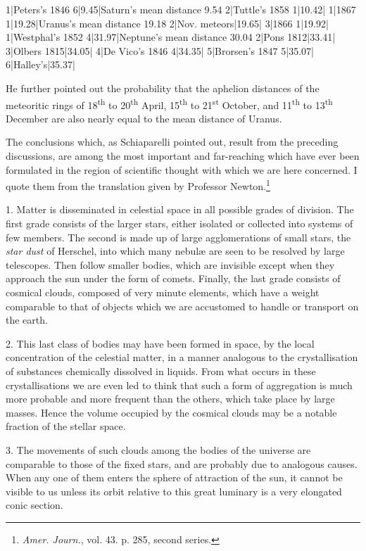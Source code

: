 \documentclass[a4paper, 12pt, oneside, polutonikogreek, english]{article}
\begin{document}
1|Peters's 1846 6|9.45|Saturn's mean distance 9.54 
2|Tuttle's 1858 1|10.42| 
1|1867 1|19.28|Uranus's mean distance 19.18 
2|Nov. meteors|19.65| 
3|1866 1|19.92| 
1|Westphal's 1852 4|31.97|Neptune's mean distance 30.04 
2|Pons 1812|33.41| 
3|Olbers 1815|34.05| 
4|De Vico's 1846 4|34.35| 
5|Brorsen's 1847 5|35.07| 
6|Halley's|35.37| 

He further pointed out the probability that the aphelion distances of the meteoritic rings of 18\textsuperscript{th} to 20\textsuperscript{th} April, 15\textsuperscript{th} to 21\textsuperscript{st} October, and 11\textsuperscript{th} to 13\textsuperscript{th} December are also nearly equal to the mean distance of Uranus.

The conclusions which, as Schiaparelli pointed out, result from the preceding discussions, are among the most important and far-reaching which have ever been formulated in the region of scientific thought with which we are here concerned. I quote them from the translation given by Professor Newton.\footnote{\emph{Amer. Journ.}, vol. 43. p. 285, second series.}

1. Matter is disseminated in celestial space in all possible grades of division. The first grade consists of the larger stars, either isolated or collected into systems of few members. The second is made up of large agglomerations of small stars, the \emph{star dust} of Herschel, into which many nebulæ are seen to be resolved by large telescopes. Then follow smaller bodies, which are invisible except when they approach the sun under the form of comets. Finally, the last grade consists of cosmical clouds, composed of very minute elements, which have a weight comparable to that of objects which we are accustomed to handle or transport on the earth.

2. This last class of bodies may have been formed in space, by the local concentration of the celestial matter, in a manner analogous to the crystallisation of substances chemically dissolved in liquids. From what occurs in these crystallisations we are even led to think that such a form of aggregation is much more probable and more frequent than the others, which take place by large masses. Hence the volume occupied by the cosmical clouds may be a notable fraction of the stellar space.

3. The movements of such clouds among the bodies of the universe are comparable to those of the fixed stars, and are probably due to analogous causes. When any one of them enters the sphere of attraction of the sun, it cannot be visible to us unless its orbit relative to this great luminary is a very elongated conic section.
\end{document}
